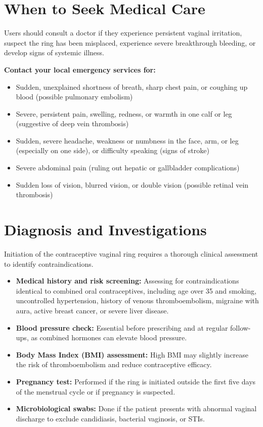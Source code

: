 \section*{When to Seek Medical Care}
Users should consult a doctor if they experience persistent vaginal irritation, suspect the ring has been misplaced, experience severe breakthrough bleeding, or develop signs of systemic illness.

\textbf{Contact your local emergency services for:}
\begin{itemize}
    \item Sudden, unexplained shortness of breath, sharp chest pain, or coughing up blood (possible pulmonary embolism)
    \item Severe, persistent pain, swelling, redness, or warmth in one calf or leg (suggestive of deep vein thrombosis)
    \item Sudden, severe headache, weakness or numbness in the face, arm, or leg (especially on one side), or difficulty speaking (signs of stroke)
    \item Severe abdominal pain (ruling out hepatic or gallbladder complications)
    \item Sudden loss of vision, blurred vision, or double vision (possible retinal vein thrombosis)
\end{itemize}

\section*{Diagnosis and Investigations}
Initiation of the contraceptive vaginal ring requires a thorough clinical assessment to identify contraindications.
\begin{itemize}
    \item \textbf{Medical history and risk screening:} Assessing for contraindications identical to combined oral contraceptives, including age over 35 and smoking, uncontrolled hypertension, history of venous thromboembolism, migraine with aura, active breast cancer, or severe liver disease.
    \item \textbf{Blood pressure check:} Essential before prescribing and at regular follow-ups, as combined hormones can elevate blood pressure.
    \item \textbf{Body Mass Index (BMI) assessment:} High BMI may slightly increase the risk of thromboembolism and reduce contraceptive efficacy.
    \item \textbf{Pregnancy test:} Performed if the ring is initiated outside the first five days of the menstrual cycle or if pregnancy is suspected.
    \item \textbf{Microbiological swabs:} Done if the patient presents with abnormal vaginal discharge to exclude candidiasis, bacterial vaginosis, or STIs.
\end{itemize}

